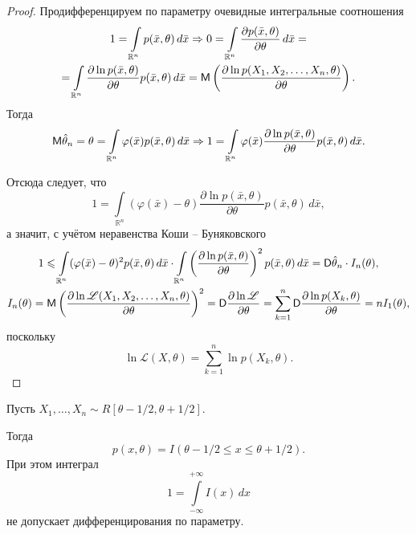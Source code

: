\begin{proof}
	Продифференцируем по параметру очевидные интегральные соотношения
	\begin{multline*}
		1 = \int\limits_{\mathbb R^n} p(\bar x, \theta) \, d\bar x \Rightarrow 0 =
		\int\limits_{\mathbb R^n} \frac{\partial p(\bar x, \theta)}{\partial\theta} \,
		d\bar x = \\ = \int\limits_{\mathbb R^n} \frac{\partial \ln p(\bar x,
		\theta)}{\partial\theta} p(\bar x, \theta) \, d\bar x = \mathsf M \left( \frac{\partial
		\ln p(X_1, X_2, \ldots, X_n, \theta)}{\partial \theta} \right).
	\end{multline*}
	Тогда
	\[
		\mathsf M \hat\theta_n = \theta = \int\limits_{\mathbb R^n} \varphi(\bar x)
		p(\bar x, \theta) \, d\bar x \Rightarrow 1 = \int\limits_{\mathbb R^n}
		\varphi(\bar x) \frac{\partial \ln
		p(\bar x, \theta)}{\partial\theta} p(\bar x, \theta) \, d\bar x.
	\]

	Отсюда следует, что
	\[
		1 = \int\limits_{\mathbb R^n} (\varphi(\bar x)-\theta) \frac{\partial \ln
		p(\bar x, \theta)}{\partial
		\theta} p(\bar x, \theta) \, d\bar x,
	\]
а значит, с учётом неравенства Коши -- Буняковского
		\begin{gather*}
		1 \leqslant \int\limits_{\mathbb R^n} (\varphi(\bar x) - \theta)^2 p(\bar x,
		\theta) \, d\bar x \cdot
		\int\limits_{\mathbb R^n} \left(\frac{\partial\ln p(\bar x,
		\theta)}{\partial\theta}\right)^2 p(\bar x, \theta)
		\, d\bar x = \mathsf D \hat \theta_n \cdot I_n(\theta),\\
		I_n(\theta) = \mathsf M \left(\frac{\partial\ln \mathscr L(X_1, X_2, \dots, X_n,
		\theta)}{\partial\theta}\right)^2 = \mathsf D \frac{\partial \ln \mathscr L}{\partial\theta}
		= \sum_{k=1}^n \mathsf D\frac{\partial \ln p(X_k, \theta)}{\partial\theta} = n
		I_1(\theta),
	\end{gather*}
	поскольку
	\[
		\ln \mathscr L(X, \theta) = \sum_{k=1}^n \ln p(X_k, \theta).
	\]
\end{proof}

\begin{ex}
  Пусть $X_1, \dots, X_n \sim R[\theta-1/2, \theta+1/2]$.

	Тогда
	\[
		p(x, \theta) = I(\theta-1/2 \leqslant x \leqslant \theta+1/2).
	\]
При этом интеграл
\[
	1 = \int\limits_{-\infty}^{+\infty} I(x) \, dx
\]
не допускает дифференцирования по параметру.
\end{ex}

